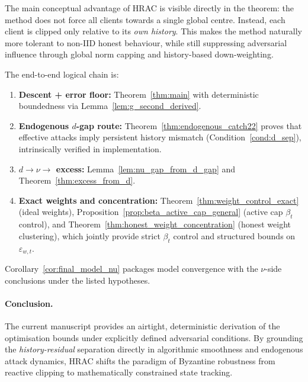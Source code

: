 \documentclass[11pt,a4paper]{article}
\theoremstyle{remark}
\begin{document}
The main conceptual advantage of HRAC is visible directly in the theorem:
the method does not force all clients towards a single global centre.
Instead, each client is clipped only relative to its \emph{own history}.
This makes the method naturally more tolerant to non-IID honest behaviour,
while still suppressing adversarial influence through global norm capping and
history-based down-weighting.

The end-to-end logical chain is:
\begin{enumerate}[label=\arabic*.]
    \item \textbf{Descent + error floor:} Theorem~\ref{thm:main} with
    deterministic boundedness via Lemma~\ref{lem:g_second_derived}.
    \item \textbf{Endogenous \(d\)-gap route:} Theorem~\ref{thm:endogenous_catch22} proves that effective attacks imply persistent history mismatch (Condition~\ref{cond:d_sep}), intrinsically verified in implementation.
    \item \textbf{\(d\to\nu\to\) excess:} Lemma~\ref{lem:nu_gap_from_d_gap} and Theorem~\ref{thm:excess_from_d}.
    \item \textbf{Exact weights and concentration:} Theorem~\ref{thm:weight_control_exact} (ideal weights), Proposition~\ref{prop:beta_active_cap_general} (active cap \(\beta_t\) control), and Theorem~\ref{thm:honest_weight_concentration} (honest weight clustering), which jointly provide strict \(\beta_t\) control and structured bounds on \(\varepsilon_{w,t}\).
\end{enumerate}

Corollary~\ref{cor:final_model_nu} packages model convergence with the
\(\nu\)-side conclusions under the listed hypotheses.

\paragraph{Conclusion.}
The current manuscript provides an airtight, deterministic derivation of the
optimisation bounds under explicitly defined adversarial conditions.
By grounding the \emph{history-residual} separation directly in algorithmic smoothness and endogenous attack dynamics, HRAC shifts the paradigm of Byzantine robustness from reactive clipping to mathematically constrained state tracking.
\end{document}
